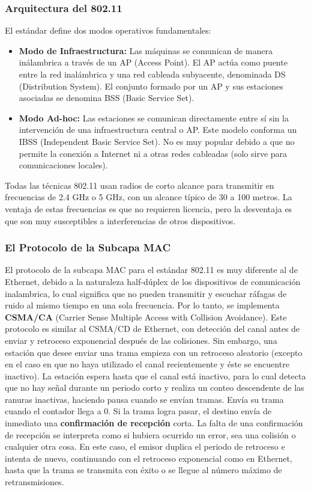 \subsubsection{Arquitectura del 802.11}

El estándar define dos modos operativos fundamentales:
\begin{itemize}
    \item \textbf{Modo de Infraestructura:} Las máquinas se comunican de manera inálambrica a través de un AP (Access Point). El AP actúa como puente entre la red inalámbrica y una red cableada subyacente, denominada DS (Distribution System). El conjunto formado por un AP y sus estaciones asociadas se denomina BSS (Basic Service Set).
    \item \textbf{Modo Ad-hoc:} Las estaciones se comunican directamente entre sí sin la intervención de una infraestructura central o AP. Este modelo conforma un IBSS (Independent Basic Service Set). No es muy popular debido a que no permite la conexión a Internet ni a otras redes cableadas (solo sirve para comunicaciones locales).
\end{itemize}

Todas las técnicas 802.11 usan radios de corto alcance para transmitir en frecuencias de 2.4 GHz o 5 GHz, con un alcance típico de 30 a 100 metros. La ventaja de estas frecuencias es que no requieren licencia, pero la desventaja es que son muy susceptibles a interferencias de otros dispositivos.

\subsubsection{El Protocolo de la Subcapa MAC}

El protocolo de la subcapa MAC para el estándar 802.11 es muy diferente al de Ethernet, debido a la naturaleza half-dúplex de los dispositivos de comunicación inalambrica, lo cual significa que no pueden transmitir y escuchar ráfagas de ruido al mismo tiempo en una sola frecuencia. Por lo tanto, se implementa \textbf{CSMA/CA} (Carrier Sense Multiple Access with Collision Avoidance). Este protocolo es similar al CSMA/CD de Ethernet, con detección del canal antes de enviar y retroceso exponencial después de las colisiones. Sin embargo, una estación que desee enviar una trama empieza con un retroceso aleatorio (excepto en el caso en que no haya utilizado el canal recientemente y éste se encuentre inactivo). La estación espera hasta que el canal está inactivo, para lo cual detecta que no hay señal durante un periodo corto y realiza un conteo descendente de las ranuras inactivas, haciendo pausa cuando se envían tramas. Envía su trama cuando el contador llega a 0. Si la trama logra pasar, el destino envía de inmediato una \textbf{confirmación de recepción} corta. La falta de una confirmación de recepción se interpreta como si hubiera ocurrido un error, sea una colisión o cualquier otra cosa. En este caso, el emisor duplica el periodo de retroceso e intenta de nuevo, continuando con el retroceso exponencial como en Ethernet, hasta que la trama se transmita con éxito o se llegue al número máximo de retransmisiones.

